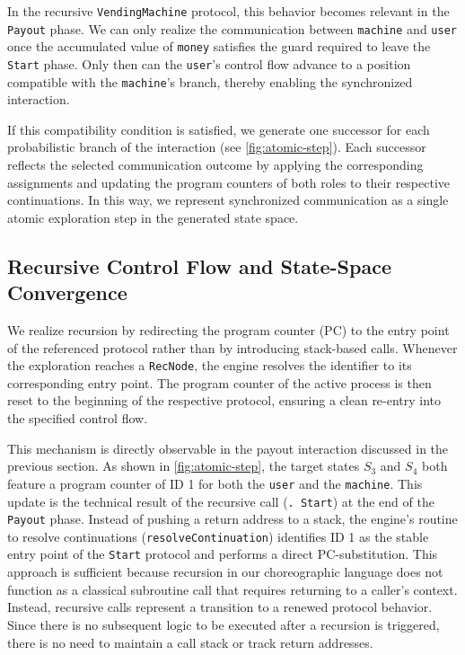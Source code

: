 In the recursive \texttt{VendingMachine} protocol, this behavior becomes relevant in the \texttt{Payout} phase. We can only realize the communication between \texttt{machine} and \texttt{user} once the accumulated value of \texttt{money} satisfies the guard required to leave the \texttt{Start} phase. Only then can the \texttt{user}'s control flow advance to a position compatible with the \texttt{machine}'s branch, thereby enabling the synchronized interaction.

If this compatibility condition is satisfied, we generate one successor for each probabilistic branch of the interaction (see \cref{fig:atomic-step}). Each successor reflects the selected communication outcome by applying the corresponding assignments and updating the program counters of both roles to their respective continuations. In this way, we represent synchronized communication as a single atomic exploration step in the generated state space.


\subsection{Recursive Control Flow and State-Space Convergence}

We realize recursion by redirecting the program counter (PC) to the entry point of the referenced protocol rather than by introducing stack-based calls. Whenever the exploration reaches a \texttt{RecNode}, the engine resolves the identifier to its corresponding entry point. The program counter of the active process is then reset to the beginning of the respective protocol, ensuring a clean re-entry into the specified control flow.

This mechanism is directly observable in the payout interaction discussed in the previous section. As shown in \cref{fig:atomic-step}, the target states $S_3$ and $S_4$ both feature a program counter of ID 1 for both the \texttt{user} and the \texttt{machine}. This update is the technical result of the recursive call (\texttt{. Start}) at the end of the \texttt{Payout} phase. Instead of pushing a return address to a stack, the engine's routine to resolve continuations (\texttt{resolve\-Continuation}) identifies ID 1 as the stable entry point of the \texttt{Start} protocol and performs a direct PC-substitution. This approach is sufficient because recursion in our choreographic language does not function as a classical subroutine call that requires returning to a caller's context. Instead, recursive calls represent a transition to a renewed protocol behavior. Since there is no subsequent logic to be executed after a recursion is triggered, there is no need to maintain a call stack or track return addresses.

